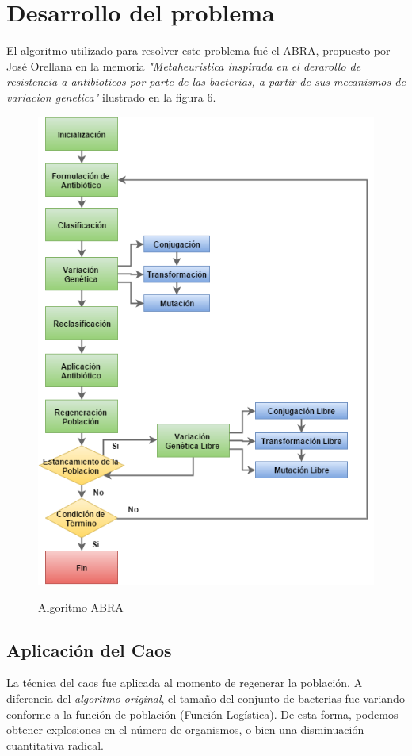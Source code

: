 \documentclass[DIV=calc, paper=a4, fontsize=11pt, twocolumn]{scrartcl}	 %
\begin{document}
\section*{Desarrollo del problema}
El algoritmo utilizado para resolver este problema fué el ABRA, propuesto por José Orellana en la memoria \emph{"Metaheuristica inspirada en el derarollo de resistencia a antibioticos por parte de las bacterias, a partir de sus mecanismos de variacion genetica"} ilustrado en la figura 6.
\begin{figure}[h]
\centering
\caption{Algoritmo ABRA} 
\includegraphics[scale=0.45]{algoritmo.png} 
\label{figura 1}
\end{figure}
\subsection*{Aplicación del Caos}
La técnica del caos fue aplicada al momento de regenerar la población. A diferencia del \emph{algoritmo original}, el tamaño del conjunto de bacterias fue variando conforme a la función de población (Función Logística). De esta forma, podemos obtener explosiones en el número de organismos, o bien una disminuación cuantitativa radical.
\end{document}
